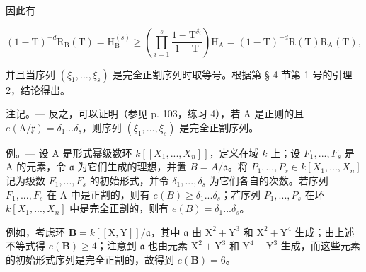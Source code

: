 因此有

\[
(1 - \mathrm{T}) ^ {- d} \mathrm{R} _ {\mathrm{B}} (\mathrm{T}) = \mathrm{H} _ {\mathrm{B}} ^ {(s)} \geqslant \left(\prod_ {i = 1} ^ {s} \frac {1 - \mathrm{T} ^ {\delta_ {i}}}{1 - \mathrm{T}}\right) \mathrm{H} _ {\mathrm{A}} = (1 - \mathrm{T}) ^ {- d} \mathrm{R} (\mathrm{T}) \mathrm{R} _ {\mathrm{A}} (\mathrm{T}),
\]

并且当序列 \((\xi_{1},\ldots,\xi_{s})\) 是完全正割序列时取等号。根据第 § 4 节第 1 号的引理 2，结论得出。

注记。--- 反之，可以证明（参见 p. 103，练习 4），若 A 是正则的且 \(e(\mathrm{A}/\mathfrak{x})=\delta_{1}\ldots\delta_{s}\)，则序列 \((\xi_{1},\ldots,\xi_{s})\) 是完全正割序列。

例。--- 设 A 是形式幂级数环 \(k[[X_1, ..., X_n]]\)，定义在域 \(k\) 上；设 \(F_1, ..., F_s\) 是 A 的元素，令 \(\mathfrak{a}\) 为它们生成的理想，并置 \(B = A/\mathfrak{a}\)。将 \(P_1, ..., P_s \in k[X_1, ..., X_n]\) 记为级数 \(F_1, ..., F_s\) 的初始形式，并令 \(\delta_1, ..., \delta_s\) 为它们各自的次数。若序列 \(F_1, ..., F_s\) 在 A 中是正割的，则有 \(e(B) \geqslant \delta_1 ... \delta_s\)；若序列 \(P_1, ..., P_s\) 在环 \(k[X_1, ..., X_n]\) 中是完全正割的，则有 \(e(B) = \delta_1 ... \delta_s\)。

例如，考虑环 \(\mathbf{B} = k[[\mathrm{X},\mathrm{Y}]] / \mathfrak{a}\)，其中 \(\mathfrak{a}\) 由 \(\mathrm{X}^2 + \mathrm{Y}^3\) 和 \(\mathrm{X}^2 + \mathrm{Y}^4\) 生成；由上述不等式得 \(e(\mathbf{B})\geqslant 4\)；注意到 \(\mathfrak{a}\) 也由元素 \(\mathrm{X}^2 + \mathrm{Y}^3\) 和 \(\mathrm{Y}^4 -\mathrm{Y}^3\) 生成，而这些元素的初始形式序列是完全正割的，故得到 \(e(\mathbf{B}) = 6\)。
